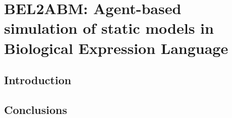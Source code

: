 \chapter{BEL2ABM: Agent-based simulation of static models in Biological Expression Language}\label{chap:bel2abm}

\section*{Introduction}

\vspace*{\fill}



\section*{Conclusions}
